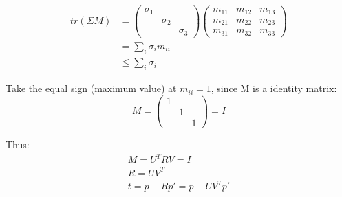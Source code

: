 \documentclass{article}
\begin{document}
\begin{align}
    tr(\Sigma M)&=
\begin{pmatrix}
    \sigma_1 &  & \\
     & \sigma_2 & \\
    &  & \sigma_3
\end{pmatrix}
\begin{pmatrix}
    m_{11} & m_{12} & m_{13} \\
    m_{21} & m_{22} & m_{23} \\
    m_{31} & m_{32} & m_{33}
\end{pmatrix}
\\
&=\sum_{i}\sigma_im_{ii}\\
&\leq \sum_{i}\sigma_i
\end{align}

\par
Take the equal sign (maximum value) at $m_{ii}=1$,
since M is a identity matrix:
\begin{equation}
    M=
\begin{pmatrix}
    1 &  & \\
     & 1 & \\
    &  & 1
\end{pmatrix}
=I
\end{equation}
\par
Thus:
\begin{gather}
    M=U^TRV=I\\
    R = UV^T\\
    t= p-Rp'=p-UV^Tp'
\end{gather}
% 
% 
\end{document}
